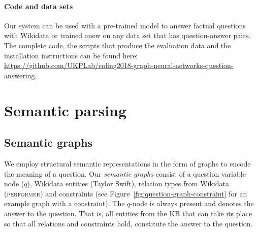 \documentclass[11pt]{article}
\begin{document}
\paragraph{Code and data sets} 
Our system can be used with a pre-trained model to answer factual questions with Wikidata or trained anew on any data set that has question-answer pairs.
The complete code, the scripts that produce the evaluation data and the installation instructions can be found here: \url{https://github.com/UKPLab/coling2018-graph-neural-networks-question-answering}.


\section{Semantic parsing}

\subsection{Semantic graphs}

We employ structural semantic representations in the form of graphs to encode the meaning of a question. 
Our \textit{semantic graphs} consist of a question variable node ($q$), Wikidata entities ({\small\sffamily Taylor Swift}), relation types from Wikidata (\textsc{performer}) and constraints (see Figure~\ref{fig:question-graph-constraint} for an example graph with a constraint). The $q$-node is always present and denotes the answer to the question. That is, all entities from the KB that can take its place so that all relations and constraints hold, constitute the answer to the question. 
\end{document}
